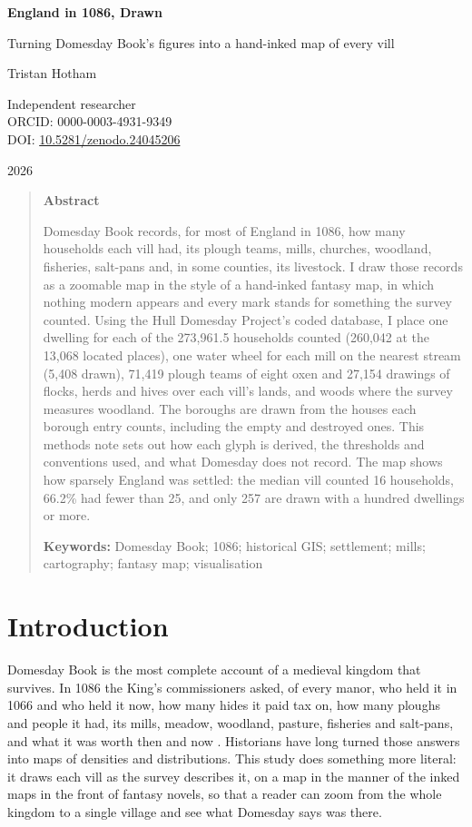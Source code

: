 \documentclass[11pt,a4paper]{article}
\begin{document}
\begin{center}
{\Large\bfseries England in 1086, Drawn\par}
\vspace{0.4em}
{\large Turning Domesday Book's figures into a hand-inked map of every vill\par}
\vspace{1.2em}
{\large Tristan Hotham\par}
\vspace{0.3em}
{\small Independent researcher\\ ORCID: 0000-0003-4931-9349\\ DOI: \href{https://doi.org/10.5281/zenodo.24045206}{10.5281/zenodo.24045206}\par}
\vspace{0.8em}
2026
\end{center}
\begin{quote}\small
\begin{center}\textbf{Abstract}\end{center}
Domesday Book records, for most of England in 1086, how many households each vill had, its plough teams, mills, churches, woodland, fisheries, salt-pans and, in some counties, its livestock. I draw those records as a zoomable map in the style of a hand-inked fantasy map, in which nothing modern appears and every mark stands for something the survey counted. Using the Hull Domesday Project's coded database, I place one dwelling for each of the 273,961.5 households counted (260,042 at the 13,068 located places), one water wheel for each mill on the nearest stream (5,408 drawn), 71,419 plough teams of eight oxen and 27,154 drawings of flocks, herds and hives over each vill's lands, and woods where the survey measures woodland. The boroughs are drawn from the houses each borough entry counts, including the empty and destroyed ones. This methods note sets out how each glyph is derived, the thresholds and conventions used, and what Domesday does not record. The map shows how sparsely England was settled: the median vill counted 16 households, 66.2\% had fewer than 25, and only 257 are drawn with a hundred dwellings or more.

\textbf{Keywords:} Domesday Book; 1086; historical GIS; settlement; mills; cartography; fantasy map; visualisation
\end{quote}

\section{Introduction}
Domesday Book is the most complete account of a medieval kingdom that survives. In 1086 the King's commissioners asked, of every manor, who held it in 1066 and who held it now, how many hides it paid tax on, how many ploughs and people it had, its mills, meadow, woodland, pasture, fisheries and salt-pans, and what it was worth then and now \cite{darby}. Historians have long turned those answers into maps of densities and distributions. This study does something more literal: it draws each vill as the survey describes it, on a map in the manner of the inked maps in the front of fantasy novels, so that a reader can zoom from the whole kingdom to a single village and see what Domesday says was there.
\end{document}
